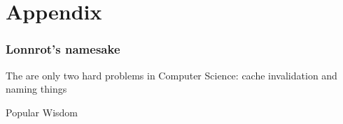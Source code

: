 \chapter*{Appendix}

\subsection*{Lonnrot's namesake}
\epigraph{The are only two hard problems in Computer Science: cache invalidation and naming things }
{Popular Wisdom}
